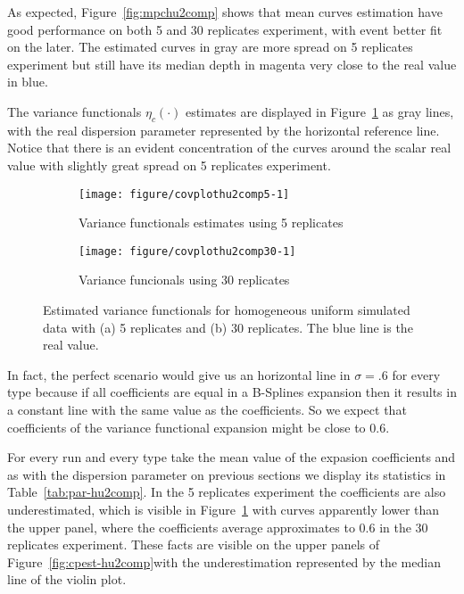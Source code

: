 As expected, Figure~\ref{fig:mpchu2comp} shows that mean curves estimation have good performance on both 5 and 30 replicates experiment, with event better fit on the later. The estimated curves in gray are more spread on 5  replicates experiment but still have its median depth in magenta very close to the real value in blue.




The variance functionals $\eta_c(\cdot)$ estimates are displayed in Figure~\ref{fig:covplot2comp} as gray lines, with the real dispersion parameter represented by the horizontal reference line. Notice that there is an evident concentration of the curves around the scalar real value with slightly great spread on 5 replicates experiment. 




\begin{figure}[t]
  \centering
  \begin{subfigure}{\textwidth}
    \centering
\begin{knitrout}
\color{fgcolor}
\texttt{[image: figure/covplothu2comp5-1]} 

\end{knitrout}
    \caption{Variance functionals estimates using 5 replicates}
  \end{subfigure}
  \begin{subfigure}{\textwidth}
    \centering
\begin{knitrout}
\color{fgcolor}
\texttt{[image: figure/covplothu2comp30-1]} 

\end{knitrout}
    \caption{Variance funcionals using 30 replicates}
  \end{subfigure}
  \caption{Estimated variance functionals for homogeneous uniform simulated data with (a) 5 replicates and (b) 30 replicates. The blue line is the real value.}
  \label{fig:covplot2comp}
\end{figure}


In fact, the perfect scenario would give us an horizontal line in $\sigma=.6$ for every type because if all coefficients are equal in a B-Splines expansion then it results in a constant line with the same value as the coefficients. So we expect that coefficients of the variance functional expansion might be close to 0.6. 

For every run and every type take the mean value of the expasion coefficients and as with the dispersion parameter on previous sections we display its statistics in Table~\ref{tab:par-hu2comp}. In the 5 replicates experiment the coefficients are also underestimated, which is visible in Figure~\ref{fig:covplot2comp} with curves apparently lower than the upper panel, where the coefficients average approximates to 0.6 in the 30 replicates experiment. These facts are visible on the upper panels of Figure~\ref{fig:cpest-hu2comp}with the underestimation represented by the median line of the violin plot.


